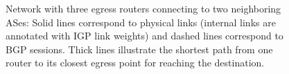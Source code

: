 \begin{figure}
\begin{center}
\begin{psfrags}
\end{psfrags}
\end{center}
\caption[Network with three egress routers connecting to two neighboring
ASes]{Network with three egress routers connecting to two neighboring
ASes: Solid lines correspond to physical links (internal links are
annotated with IGP link weights) and dashed lines correspond to BGP
sessions.  Thick lines illustrate the shortest path from one router to
its closest egress point for reaching the destination.} 
\label{fig:example}
\end{figure}


